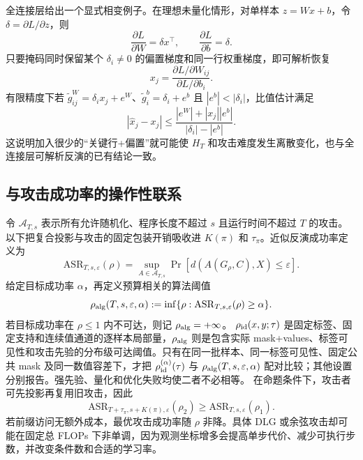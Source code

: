 \documentclass[conference,a4paper]{IEEEtran}
\newcommand{\ASR}{\mathrm{ASR}}
\begin{document}
全连接层给出一个显式相变例子。在理想未量化情形，对单样本 $z=Wx+b$，令 $\delta=\partial L/\partial z$，则
\begin{equation}
\frac{\partial L}{\partial W}=\delta x^\top,
\qquad
\frac{\partial L}{\partial b}=\delta.
\end{equation}
只要掩码同时保留某个 $\delta_i\neq0$ 的偏置梯度和同一行权重梯度，即可解析恢复
\begin{equation}
x_j=\frac{\partial L/\partial W_{ij}}{\partial L/\partial b_i}.
\label{eq:analyticinverse}
\end{equation}
有限精度下若 $\widetilde g^W_{ij}=\delta_ix_j+e^W$、$\widetilde g^b_i=\delta_i+e^b$ 且 $|e^b|<|\delta_i|$，比值估计满足
\begin{equation}
|\widehat x_j-x_j|\leq
\frac{|e^W|+|x_j||e^b|}{|\delta_i|-|e^b|}.
\end{equation}
这说明加入很少的“关键行+偏置”就可能使 $H_T$ 和攻击难度发生离散变化，也与全连接层可解析反演的已有结论一致\cite{geiping2020inverting}。

\subsection{与攻击成功率的操作性联系}

令 $\mathcal A_{T,s}$ 表示所有允许随机化、程序长度不超过 $s$ 且运行时间不超过 $T$ 的攻击。以下把复合投影与攻击的固定包装开销吸收进 $K(\pi)$ 和 $\tau_\pi$。近似反演成功率定义为
\begin{equation}
\ASR_{T,s,\varepsilon}(\rho)=
\sup_{A\in\mathcal A_{T,s}}
\Pr[d(A(G_\rho,C),X)\leq\varepsilon].
\end{equation}
给定目标成功率 $\alpha$，再定义预算相关的算法阈值
\begin{equation}
\rho_{\rm alg}(T,s,\varepsilon,\alpha)
:=\inf\{\rho:\ASR_{T,s,\varepsilon}(\rho)\geq\alpha\}.
\end{equation}
若目标成功率在 $\rho\leq1$ 内不可达，则记 $\rho_{\rm alg}=+\infty$。
$\rho_{\rm id}(x,y;\tau)$ 是固定标签、固定支持和连续值通道的逐样本局部量，$\rho_{\rm alg}$ 则是包含实际 mask+values、标签可见性和攻击先验的分布级可达阈值。只有在同一批样本、同一标签可见性、固定公共 mask 及同一数值容差下，才把 $\rho_{\rm id}^{(\alpha)}(\tau)$ 与 $\rho_{\rm alg}(T,s,\varepsilon,\alpha)$ 配对比较；其他设置分别报告。强先验、量化和优化失败均使二者不必相等。
在命题条件下，攻击者可先投影再复用旧攻击，因此
\begin{equation}
\ASR_{T+\tau_\pi,s+K(\pi),\varepsilon}(\rho_2)
\geq\ASR_{T,s,\varepsilon}(\rho_1).
\label{eq:asrmono}
\end{equation}
若前缀访问无额外成本，最优攻击成功率随 $\rho$ 非降。具体 DLG 或余弦攻击却可能在固定总 FLOPs 下非单调，因为观测坐标增多会提高单步代价、减少可执行步数，并改变条件数和合适的学习率。
\end{document}
